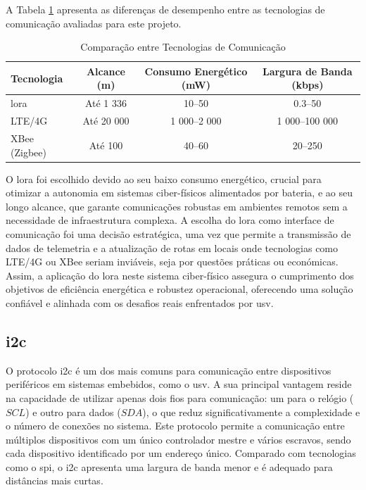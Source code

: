 A Tabela \ref{tab:comparacao_comunicacao} apresenta as diferenças de desempenho entre as tecnologias de comunicação avaliadas para este projeto.

\begin{table}[H]
    \centering
    \caption{Comparação entre Tecnologias de Comunicação}
    \label{tab:comparacao_comunicacao}
    \begin{tabular}{lccc}
        \textbf{Tecnologia} & \textbf{Alcance (m)} & \textbf{Consumo Energético (mW)} & \textbf{Largura de Banda (kbps)} \\ \hline 
        \gls{lora} & Até 1 336 & 10--50 & 0.3--50 \\ 
        LTE/4G & Até 20 000 & 1 000--2 000 & 1 000--100 000 \\ 
        XBee (Zigbee) & Até 100 & 40--60 & 20--250 \\
        \hline 
    \end{tabular}%
\end{table}

O \gls{lora} foi escolhido devido ao seu baixo consumo energético, crucial para otimizar a autonomia em sistemas ciber-físicos alimentados por bateria, e ao seu longo alcance, que garante comunicações robustas em ambientes remotos sem a necessidade de infraestrutura complexa. A escolha do \gls{lora} como interface de comunicação foi uma decisão estratégica, uma vez que permite a transmissão de dados de telemetria e a atualização de rotas em locais onde tecnologias como LTE/4G ou XBee seriam inviáveis, seja por questões práticas ou económicas. Assim, a aplicação do \gls{lora} neste sistema ciber-físico assegura o cumprimento dos objetivos de eficiência energética e robustez operacional, oferecendo uma solução confiável e alinhada com os desafios reais enfrentados por \gls{usv}.

\subsection{\acrfull{i2c}} \label{subsec:i2c}

O protocolo \gls{i2c} é um dos mais comuns para comunicação entre dispositivos periféricos em sistemas embebidos, como o \gls{usv}. A sua principal vantagem reside na capacidade de utilizar apenas dois fios para comunicação: um para o relógio (\(SCL\)) e outro para dados (\(SDA\)), o que reduz significativamente a complexidade e o número de conexões no sistema. Este protocolo permite a comunicação entre múltiplos dispositivos com um único controlador mestre e vários escravos, sendo cada dispositivo identificado por um endereço único. Comparado com tecnologias como o \gls{spi}, o \gls{i2c} apresenta uma largura de banda menor e é adequado para distâncias mais curtas.

